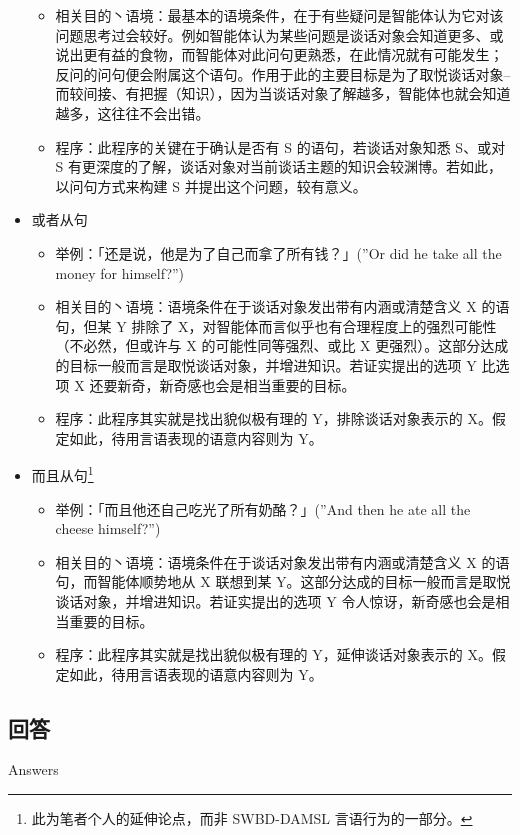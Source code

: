 \begin{itemize}
\begin{itemize}
\item 相关目的丶语境：最基本的语境条件，在于有些疑问是智能体认为它对该问题思考过会较好。例如智能体认为某些问题是谈话对象会知道更多、或说出更有益的食物，而智能体对此问句更熟悉，在此情况就有可能发生；反问的问句便会附属这个语句。作用于此的主要目标是为了取悦谈话对象– 而较间接、有把握（知识），因为当谈话对象了解越多，智能体也就会知道越多，这往往不会出错。 
\item 程序：此程序的关键在于确认是否有 S 的语句，若谈话对象知悉 S、或对 S 有更深度的了解，谈话对象对当前谈话主题的知识会较渊博。若如此，以问句方式来构建 S 并提出这个问题，较有意义。
\end{itemize}
\item 或者从句
\begin{itemize}
\item 举例：「还是说，他是为了自己而拿了所有钱？」(”Or did he take all the money for himself?”)
\item 相关目的丶语境：语境条件在于谈话对象发出带有内涵或清楚含义 X 的语句，但某 Y 排除了 X，对智能体而言似乎也有合理程度上的强烈可能性（不必然，但或许与 X 的可能性同等强烈、或比 X 更强烈）。这部分达成的目标一般而言是取悦谈话对象，并增进知识。若证实提出的选项 Y 比选项 X 还要新奇，新奇感也会是相当重要的目标。 
\item 程序：此程序其实就是找出貌似极有理的 Y，排除谈话对象表示的 X。假定如此，待用言语表现的语意内容则为 Y。
\end{itemize}
\item 而且从句\footnote{此为笔者个人的延伸论点，而非 SWBD-DAMSL 言语行为的一部分。}
\begin{itemize}
\item 举例：「而且他还自己吃光了所有奶酪？」(”And then he ate all the cheese himself?”)
\item 相关目的丶语境：语境条件在于谈话对象发出带有内涵或清楚含义 X 的语句，而智能体顺势地从 X 联想到某 Y。这部分达成的目标一般而言是取悦谈话对象，并增进知识。若证实提出的选项 Y 令人惊讶，新奇感也会是相当重要的目标。
\item 程序：此程序其实就是找出貌似极有理的 Y，延伸谈话对象表示的 X。假定如此，待用言语表现的语意内容则为 Y。
\end{itemize}
\end{itemize}

\subsection{回答}{Answers}

